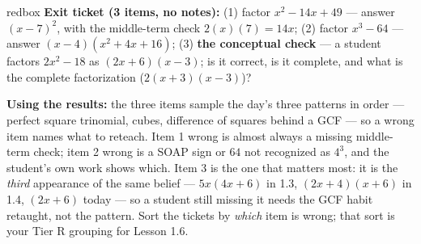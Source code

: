 \documentclass[10pt]{article}
\begin{document}
\begin{skillbox}{redbox}
\textbf{Exit ticket (3 items, no notes):} (1) factor $x^2-14x+49$ --- answer $(x-7)^2$, with the
middle-term check $2(x)(7)=14x$; (2) factor $x^3-64$ --- answer $(x-4)\left(x^2+4x+16\right)$;
(3) \textbf{the conceptual check} --- a student factors $2x^2-18$ as $(2x+6)(x-3)$; is it correct,
is it complete, and what is the complete factorization ($2(x+3)(x-3)$)?

\textbf{Using the results:} the three items sample the day's three patterns in order --- perfect
square trinomial, cubes, difference of squares behind a GCF --- so a wrong item names what to
reteach. Item 1 wrong is almost always a missing middle-term check; item 2 wrong is a SOAP sign or
$64$ not recognized as $4^3$, and the student's own work shows which. Item 3 is the one that
matters most: it is the \emph{third} appearance of the same belief --- $5x(4x+6)$ in 1.3,
$(2x+4)(x+6)$ in 1.4, $(2x+6)$ today --- so a student still missing it needs the GCF habit
retaught, not the pattern. Sort the tickets by \emph{which} item is wrong; that sort is your Tier R
grouping for Lesson 1.6.
\end{skillbox}
\end{document}
